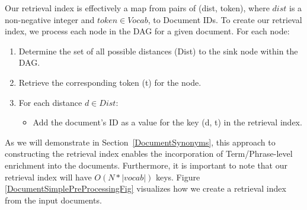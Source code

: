   Our retrieval index is effectively a map from pairs of (dist, token), where $dist$ is a non-negative integer and $token \in Vocab$, to Document IDs. To create our retrieval index, we process each node in the DAG for a given document. For each node:
\begin{enumerate}
  \item Determine the set of all possible distances (Dist) to the sink node within the DAG.
  \item Retrieve the corresponding token (t) for the node.
  \item For each distance $d \in Dist$:
    \begin{itemize}
      \item Add the document's ID as a value for the key (d, t) in the retrieval index.
    \end{itemize}
\end{enumerate}

As we will demonstrate in Section~\ref{DocumentSynonyms}, this approach to constructing the retrieval index enables the incorporation of Term/Phrase-level enrichment into the documents. Furthermore, it is important to note that our retrieval index will have $O(N * |vocab|)$ keys.
Figure \ref{DocumentSimplePreProcessingFig} visualizes how we create a retrieval index from the input documents.



